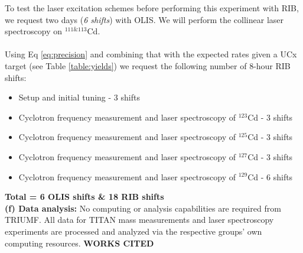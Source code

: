 \documentclass[12pt]{article}
\begin{document}
To test the laser excitation schemes before performing this experiment with RIB, we request two days (\emph{6 shifts}) with OLIS. We will perform the collinear laser spectroscopy on $^{111 \& 113}$Cd.
\\\\
Using Eq \ref{eq:precision} and combining that with the expected rates given a UCx target (see Table \ref{table:yields}) we request the following number of 8-hour RIB shifts:
\begin{itemize}
    \item Setup and initial tuning - 3 shifts
    \item Cyclotron frequency measurement and laser spectroscopy of $^{123}$Cd - 3 shifts
    \item Cyclotron frequency measurement and laser spectroscopy of $^{125}$Cd - 3 shifts
    \item Cyclotron frequency measurement and laser spectroscopy of $^{127}$Cd - 3 shifts
    \item Cyclotron frequency measurement and laser spectroscopy of $^{129}$Cd - 6 shifts
\end{itemize}
\textbf{Total = 6 OLIS shifts \& 18 RIB shifts}\\

\noindent\textbf{(f) Data analysis:}
No computing or analysis capabilities are required from TRIUMF. All data for TITAN mass measurements and laser spectroscopy experiments are processed and analyzed via the respective groups' own computing resources.
\newpage
\textbf{WORKS CITED}
\\


\end{document}
